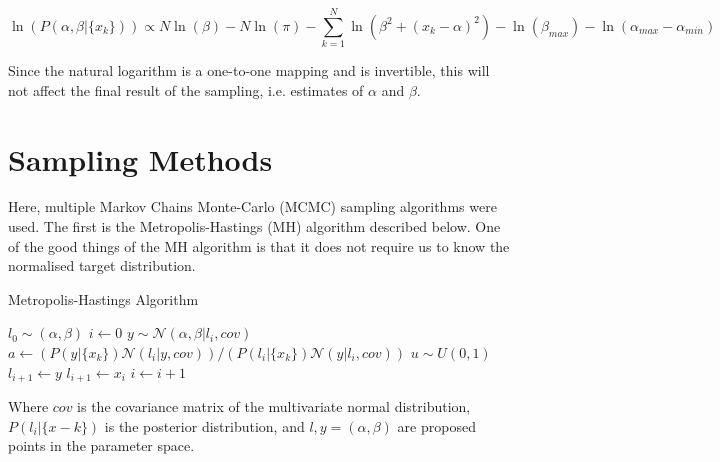 \documentclass[12pt]{report} %
\begin{document}
\begin{equation}
    \ln(P(\alpha, \beta | \{x_{k}\})) \propto N\ln(\beta) - N\ln(\pi) - \sum_{k=1}^{N}\ln(\beta^{2} + (x_{k} - \alpha)^{2}) - \ln(\beta_{max}) - \ln(\alpha_{max} - \alpha_{min})
\end{equation}

Since the natural logarithm is a one-to-one mapping and is invertible, this will not affect the final result of the sampling, i.e. estimates of $\alpha$ and $\beta$.

\section{Sampling Methods}

Here, multiple Markov Chains Monte-Carlo (MCMC) sampling algorithms were used. The first is the Metropolis-Hastings (MH) algorithm described below\cite{ravenzwaaij_markov_chain}. One of the good things of the MH algorithm is that it does not require us to know the normalised target distribution.

\begin{definitionbox}{Metropolis-Hastings Algorithm}
    \begin{algorithmic}[1]
        \State $l_{0} \sim (\alpha, \beta)$ 
        \State $i \gets 0$
         
            \State $y \sim \mathcal{N}(\alpha, \beta | l_{i}, cov)$ 
            \State $a \gets (P(y|\{x_{k}\})\mathcal{N}(l_{i}|y, cov))/(P(l_{i}|\{x_{k}\})\mathcal{N}(y|l_{i}, cov))$ 
            \State $u \sim U(0, 1)$ 
                \State $l_{i+1} \gets y$ 
            \Else
                \State $l_{i+1} \gets x_{i}$ 
            \EndIf
            \State $i \gets i + 1$
        \EndWhile
        \end{algorithmic}
    Where $cov$ is the covariance matrix of the multivariate normal distribution, $P(l_{i}|\{x-{k}\})$ is the posterior distribution, and $l, y = (\alpha, \beta)$ are proposed points in the parameter space.
\end{definitionbox}
\end{document}
